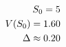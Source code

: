 \documentclass[preview]{standalone}
\begin{document}
\begin{align*}
\special{dvisvgm:raw <g id='unique000'>}S_0 = 5\\V(S_0) = 1.60\\\Delta \approx 0.20\special{dvisvgm:raw </g>}
\end{align*}
\end{document}
